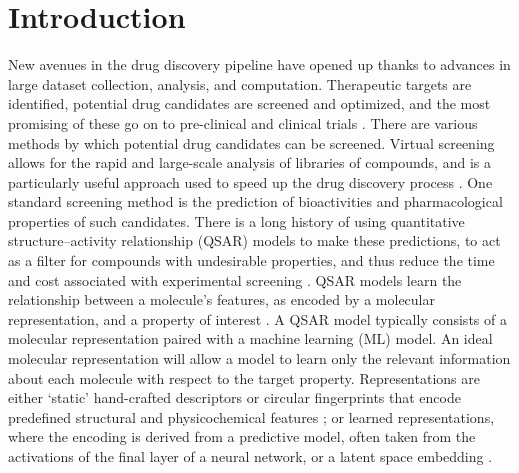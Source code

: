 

\chapter{Introduction}\label{chap:intro}

New avenues in the drug discovery pipeline have opened up thanks to advances in large dataset collection, analysis, and computation. Therapeutic targets are identified, potential drug candidates are screened and optimized, and the most promising of these go on to pre-clinical and clinical trials \citep{Lill2007}. There are various methods by which potential drug candidates can be screened. Virtual screening allows for the rapid and large-scale analysis of libraries of compounds, and is a particularly useful approach used to speed up the drug discovery process \citep{Neves2018}. One standard screening method is the prediction of bioactivities and pharmacological properties of such candidates. There is a long history of using quantitative structure--activity relationship (QSAR) models to make these predictions, to act as a filter for compounds with undesirable properties, and thus reduce the time and cost associated with experimental screening \citep{Sabando2021}. QSAR models learn the relationship between a molecule's features, as encoded by a molecular representation, and a property of interest \citep{Sabando2021}. A QSAR model typically consists of a molecular representation paired with a machine learning (ML) model. An ideal molecular representation will allow a model to learn only the relevant information about each molecule with respect to the target property. Representations are either `static' hand-crafted descriptors or circular fingerprints that encode predefined structural and physicochemical features \citep{rogers2010, David2020, sns, avalon}; or learned representations, where the encoding is derived from a predictive model, often taken from the activations of the final layer of a neural network, or a latent space embedding \citep{Sabando2021, kishimoto2023}. 


